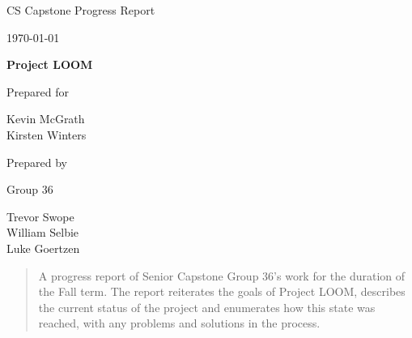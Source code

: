 \documentclass[onecolumn, draftclsnofoot,10pt, compsoc]{IEEEtran}
\def \CapstoneTeamName{     }
\def \CapstoneTeamNumber{       36}
\def \GroupMemberOne{           Trevor Swope}
\def \GroupMemberTwo{           William Selbie}
\def \GroupMemberThree{         Luke Goertzen}
\def \CapstoneProjectName{      Project LOOM}
\def \CapstoneSponsorPerson{    Chet Udell}
\def \DocType{  %
                Progress Report
                }
\newcommand{\NameSigPair}[1]{\par
\makebox[2.75in][r]{#1} \hfil   \makebox[3.25in]{\makebox[2.25in]{\hrulefill} \hfill        \makebox[.75in]{\hrulefill}}
\par\vspace{-12pt} \textit{\tiny\noindent
\makebox[2.75in]{} \hfil        \makebox[3.25in]{\makebox[2.25in][r]{Signature} \hfill  \makebox[.75in][r]{Date}}}}
\begin{document}
\begin{titlepage}
    \begin{singlespace}
        \hfill 
        \par\vspace{.2in}
        \centering
        \scshape{
            \huge CS Capstone \DocType \par
            {\large\today}\par
            \vspace{.5in}
            \textbf{\Huge\CapstoneProjectName}\par
            \vfill
            {\large Prepared for}\par
            \Huge Kevin McGrath \\ Kirsten Winters \par
            \vspace{5pt}
            {\large Prepared by }\par
            Group\CapstoneTeamNumber\par
            \CapstoneTeamName\par 
            \vspace{5pt}
            \GroupMemberOne \\
            \GroupMemberTwo \\
            \GroupMemberThree \\
            \vspace{20pt}
        }
        \begin{abstract}
            A progress report of Senior Capstone Group 36's work for the duration of the Fall term. The report reiterates the goals of Project LOOM, describes the current status of the project and enumerates how this state was reached, with any problems and solutions in the process.
        \end{abstract}     
    \end{singlespace}
\end{titlepage}
\newpage
{}
\tableofcontents
\listoffigures
\listoflistings
\clearpage
\end{document}
